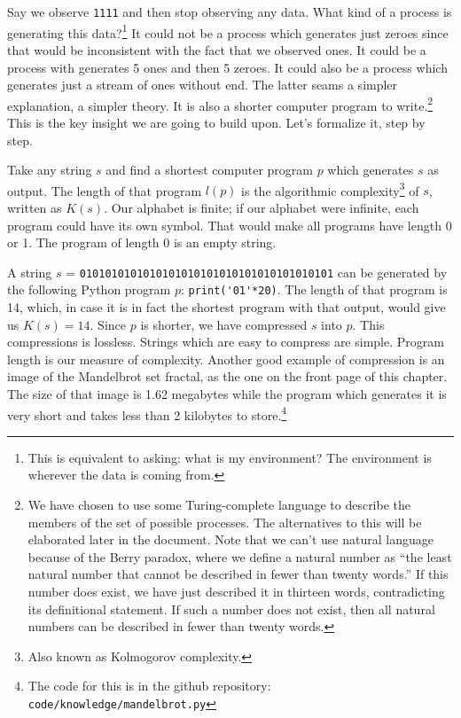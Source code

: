 Say we observe \texttt{1111} and then stop observing any data.
What kind of a process is generating this data?\footnote{This is equivalent to asking: what is my environment? The environment is wherever the data is coming from.}
It could not be a process which generates just zeroes since that would be inconsistent with the fact that we observed ones.
It could be a process with generates 5 ones and then 5 zeroes.
It could also be a process which generates just a stream of ones without end.
The latter seams a simpler explanation, a simpler theory.
It is also a shorter computer program to write.\footnote{
We have chosen to use some Turing-complete language to describe the members of the set of possible processes.
The alternatives to this will be elaborated later in the document.
Note that we can't use natural language because of the Berry paradox, where we define a natural number as “the least natural number that cannot be described in fewer than twenty words.”
If this number does exist, we have just described it in thirteen words, contradicting its definitional statement.
If such a number does not exist, then all natural numbers can be described in fewer than twenty words.
}
This is the key insight we are going to build upon.
Let's formalize it, step by step.

Take any string $s$ and find a shortest computer program $p$ which generates $s$ as output.
The length of that program $l(p)$ is the algorithmic complexity\footnote{Also known as Kolmogorov complexity.} of $s$, written as $K(s)$.
Our alphabet is finite; if our alphabet were infinite, each program could have its own symbol.
That would make all programs have length 0 or 1.
The program of length 0 is an empty string.

A string $s$ = \texttt{0101010101010101010101010101010101010101} can be generated by the following Python program $p$: \verb|print('01'*20)|.
The length of that program is 14, which, in case it is in fact the shortest program with that output, would give us $K(s) = 14$.
Since $p$ is shorter, we have compressed $s$ into $p$.
This compressions is lossless.
Strings which are easy to compress are simple.
Program length is our measure of complexity.
Another good example of compression is an image of the Mandelbrot set fractal, as the one on the front page of this chapter.
The size of that image is 1.62 megabytes while the program which generates it is very short and takes less than 2 kilobytes to store.\footnote{The code for this is in the github repository: \texttt{code/knowledge/mandelbrot.py}}


